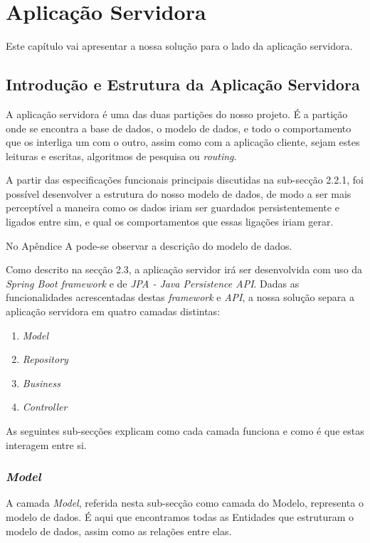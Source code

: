 %
\chapter{Aplicação Servidora} \label{cap:exemplos}

Este capítulo vai apresentar a nossa solução para o lado da aplicação servidora.

\section{Introdução e Estrutura da Aplicação Servidora} \label{sec31}
A aplicação servidora é uma das duas partições do nosso projeto. É a partição onde se encontra a base de dados, o modelo de dados, e todo o comportamento que os interliga um com o outro, assim como com a aplicação cliente, sejam estes leituras e escritas, algoritmos de pesquisa ou \emph{routing}.

A partir das especificações funcionais principais discutidas na sub-secção 2.2.1, foi possível desenvolver a estrutura do nosso modelo de dados, de modo a ser mais perceptível a maneira como os dados iriam ser guardados persistentemente e ligados entre sim, e qual os comportamentos que essas ligações iriam gerar. 

No Apêndice A pode-se observar a descrição do modelo de dados.

Como descrito na secção 2.3, a aplicação servidor irá ser desenvolvida com uso da \emph{Spring Boot framework} e de 
\emph{JPA - Java Persistence API}. Dadas as funcionalidades acrescentadas destas \emph{framework} e \emph{API}, a nossa solução separa a aplicação servidora em quatro camadas distintas:
\begin{enumerate}
	\item \emph{Model}
	\item \emph{Repository}
	\item \emph{Business}
	\item \emph{Controller}
\end{enumerate}
As seguintes sub-secções explicam como cada camada funciona e como é que estas interagem entre si.

\subsection{\emph{Model}} \label{sec311}
A camada \emph{Model}, referida nesta sub-secção como camada do Modelo, representa o modelo de dados. É aqui que encontramos todas as Entidades que estruturam o modelo de dados, assim como as relações entre elas. 

